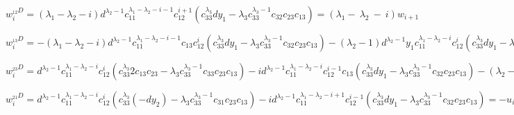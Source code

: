 %
%
$ w_i^{_{12}D} = (\lambda_1 - \lambda_2 - i) d^{\lambda_2 - 1} c_{11}^{\lambda_1 - \lambda_2 - i - 1} c_{12}^{i + 1} (c_{33}^{\lambda_3} d y_1 - \lambda_3 c_{33}^{\lambda_3 - 1} c_{32}c_{23}c_{13}) = (\lambda_1 - ~\lambda_2 ~- ~i) w_{i + 1} $
\newline

%
%
$ w_i^{_{13}D} = - (\lambda_1 - \lambda_2 - i) d^{\lambda_2 - 1} c_{11}^{\lambda_1 - \lambda_2 - i - 1} c_{13} c_{12}^i (c_{33}^{\lambda_3} d y_1 - \lambda_3 c_{33}^{\lambda_3 - 1} c_{32}c_{23}c_{13}) - (\lambda_2 - 1) d^{\lambda_2 - 1} y_1 c_{11}^{\lambda_1 - \lambda_2 - i} c_{12}^i (c_{33}^{\lambda_3} d y_1 - \lambda_3 c_{33}^{\lambda_3 - 1} c_{32}c_{23}c_{13}) = 
- (\lambda_1 - \lambda_2 - i) d^{\lambda_2 - 1} c_{11}^{\lambda_1 - \lambda_2 - i - 1} c_{12}^i c_{33}^{\lambda_3} c_{13} d y_1 = - (\lambda_1 - \lambda_2 - i) d^{\lambda_2 - 1} c_{11}^{\lambda_1 - \lambda_2 - i - 1} c_{12}^i c_{33}^{\lambda_3} (-c_{13}c_{12}c_{23}) = (\lambda_1 - \lambda_2 - i) d^{\lambda_2 - 1} c_{11}^{\lambda_1 - \lambda_2 - i - 1} c_{12}^{i + 1} c_{33}^{\lambda_3} c_{13}c_{23} = (\lambda_1 - \lambda_2 - i) r_{i + 1} $
\newline

%
%
$ w_i^{_{23}D} = d^{\lambda_2 - 1} c_{11}^{\lambda_1 - \lambda_2 - i} c_{12}^i (c_{33}^{\lambda_3} 2 c_{13}c_{23} - \lambda_3 c_{33}^{\lambda_3 - 1} c_{33}c_{23}c_{13}) - i d^{\lambda_2 - 1} c_{11}^{\lambda_1 - \lambda_2 - i} c_{12}^{i - 1} c_{13} (c_{33}^{\lambda_3} d y_1 - \lambda_3 c_{33}^{\lambda_3 - 1} c_{32}c_{23}c_{13}) - (\lambda_2 - 1) d^{\lambda_2 - 1} y_2 c_{11}^{\lambda_1 - \lambda_2 - i} c_{12}^i (c_{33}^{\lambda_3} d y_1 - \lambda_3 c_{33}^{\lambda_3 - 1} c_{32}c_{23}c_{13}) = (\lambda_3 + 2) d^{\lambda_2 - 1} c_{11}^{\lambda_1 - \lambda_2 - i} c_{12}^i c_{33}^{\lambda_3} c_{13}c_{23} - i d^{\lambda_2 - 1} c_{11}^{\lambda_1 - \lambda_2 - i} c_{12}^{i - 1} c_{33}^{\lambda_3} c_{13} d y_1 - (\lambda_2 - 1) d^{\lambda_2 - 1} c_{11}^{\lambda_1 - \lambda_2 - i} c_{12}^i c_{33}^{\lambda_3} d y_1 y_2 = (\lambda_3 + 2) r_i + i r_i + (\lambda_2 - 1) r_i = (\lambda_2 + \lambda_3 + i + 1) r_i $
\newline

%
%
$ w_i^{_{21}D} = d^{\lambda_2 - 1} c_{11}^{\lambda_1 - \lambda_2 - i} c_{12}^i (c_{33}^{\lambda_3} (-d y_2) - \lambda_3 c_{33}^{\lambda_3 - 1} c_{31}c_{23}c_{13}) - i d^{\lambda_2 - 1} c_{11}^{\lambda_1 - \lambda_2 - i + 1} c_{12}^{i - 1} (c_{33}^{\lambda_3} d y_1 - \lambda_3 c_{33}^{\lambda_3 - 1} c_{32}c_{23}c_{13}) = - u_i - i w_{i - 1} $
\newline

